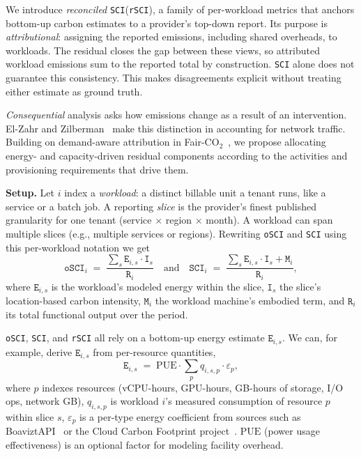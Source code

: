 \documentclass[sigconf,screen,nonacm]{acmart}
\newcommand{\parag}[1]{\vspace{2mm}\noindent\textbf{#1.}\hspace{2mm}}
\newcommand{\SCI}{\texttt{SCI}\xspace}
\newcommand{\RSCI}{\texttt{rSCI}\xspace}
\newcommand{\OSCI}{\texttt{oSCI}\xspace}
\newcommand{\E}{\texttt{E}\xspace}
\newcommand{\I}{\texttt{I}\xspace}
\newcommand{\M}{\texttt{M}\xspace}
\newcommand{\R}{\texttt{R}\xspace}
\begin{document}
We introduce \emph{reconciled} \SCI (\RSCI), a family of per-workload metrics that anchors bottom-up carbon estimates to a provider's top-down report.
Its purpose is \emph{attributional}: assigning the reported emissions, including shared overheads, to workloads.
The residual closes the gap between these views, so attributed workload emissions sum to the reported total by construction.
\SCI alone does not guarantee this consistency.
This makes disagreements explicit without treating either estimate as ground truth.

\emph{Consequential} analysis asks how emissions change as a result of an intervention.
El-Zahr and Zilberman~\cite{elzahr2025measurement} make this distinction in accounting for network traffic.
Building on demand-aware attribution in Fair-CO$_2$~\cite{han2025fairco2}, we propose allocating energy- and capacity-driven residual components according to the activities and provisioning requirements that drive them.

\parag{Setup}
Let $i$ index a \emph{workload}: a distinct billable unit a tenant runs, like a service or a batch job.
A reporting \emph{slice} is the provider's finest published granularity for one tenant (service $\times$ region $\times$ month).
A workload can span multiple slices (e.g., multiple services or regions).
Rewriting \OSCI and \SCI using this per-workload notation we get
\begin{equation}
\OSCI_i \;=\; \frac{\sum_s \E_{i,s}\cdot\I_s}{\R_i}
\quad\text{and}\quad
\SCI_i \;=\; \frac{\sum_s \E_{i,s}\cdot\I_s + \M_i}{\R_i},
\label{eq:osci-sci-repetition}
\end{equation}
where $\E_{i,s}$ is the workload's modeled energy within the slice, $\I_s$ the slice's location-based carbon intensity, $\M_i$ the workload machine's embodied term, and $\R_i$ its total functional output over the period.

\OSCI, \SCI, and \RSCI all rely on a bottom-up energy estimate $\E_{i,s}$.
We can, for example, derive $\E_{i,s}$ from per-resource quantities,
\begin{equation}
\E_{i,s} \;=\; \mathrm{PUE}\cdot\sum_{p} q_{i,s,p} \cdot \varepsilon_p,
\label{eq:bu-energy}
\end{equation}
where $p$ indexes resources (vCPU-hours, GPU-hours, GB-hours of storage, I/O ops, network GB),
$q_{i,s,p}$ is workload $i$'s measured consumption of resource $p$ within slice $s$,
$\varepsilon_p$ is a per-type energy coefficient from sources such as BoaviztAPI~\cite{simon2024boaviztapi} or the Cloud Carbon Footprint project~\cite{cloudcarbonfootprint}.
$\mathrm{PUE}$ (power usage effectiveness) is an optional factor for modeling facility overhead.
\end{document}
